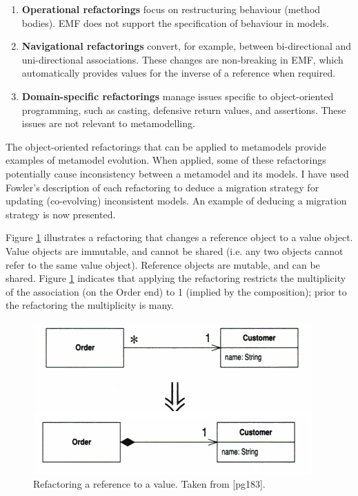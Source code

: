 \begin{enumerate}
	\item \textbf{Operational refactorings} focus on restructuring behaviour (method bodies). EMF does not support the specification of behaviour in models.
	\item \textbf{Navigational refactorings} convert, for example, between bi-directional and uni-directional associations. These changes are non-breaking in EMF, which automatically provides values for the inverse of a reference when required.
	\item \textbf{Domain-specific refactorings} manage issues specific to object-oriented programming, such as casting, defensive return values, and assertions. These issues are not relevant to metamodelling.
\end{enumerate}

The object-oriented refactorings that can be applied to metamodels provide examples of metamodel evolution. When applied, some of these refactorings potentially cause inconsistency between a metamodel and its models. I have used Fowler's description of each refactoring to deduce a migration strategy for updating (co-evolving) inconsistent models. An example of deducing a migration strategy is now presented.

Figure \ref{fig:refactoring} illustrates a refactoring that changes a reference object to a value object. Value objects are immutable, and cannot be shared (i.e. any two objects cannot refer to the same value object). Reference objects are mutable, and can be shared. Figure \ref{fig:refactoring} indicates that applying the refactoring restricts the multiplicity of the association (on the Order end) to 1 (implied by the composition); prior to the refactoring the multiplicity is many.

\begin{figure}[htbp]
  \begin{center}
    \leavevmode
    \includegraphics[scale=0.5]{refactoring.png}
  \end{center}
  \caption{Refactoring a reference to a value. Taken from \cite{fowler99refactoring}[pg183].}
  \label{fig:refactoring}
\end{figure}

